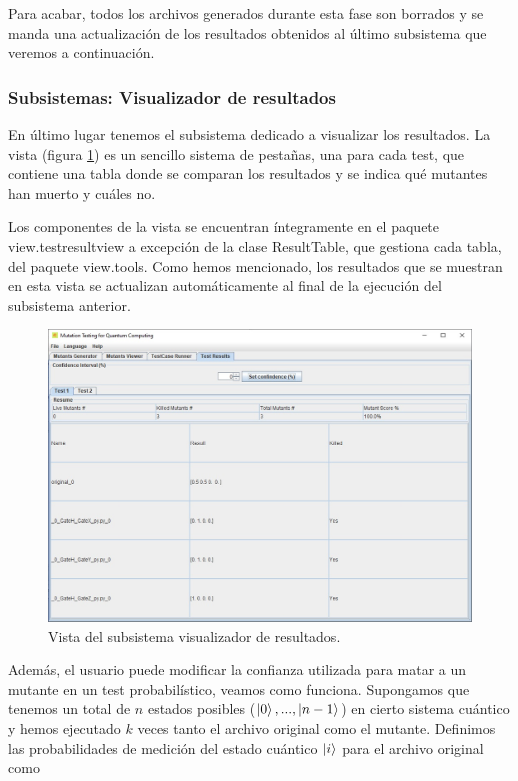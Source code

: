 Para acabar, todos los archivos generados durante esta fase son borrados y se manda una actualización de los resultados obtenidos al último subsistema que veremos a continuación.

\subsubsection{Subsistemas: Visualizador de resultados}

En último lugar tenemos el subsistema dedicado a visualizar los resultados. La vista (figura \ref{fig:vista4}) es un sencillo sistema de pestañas, una para cada test, que contiene una tabla donde se comparan los resultados y se indica qué mutantes han muerto y cuáles no.

Los componentes de la vista se encuentran íntegramente en el paquete view.testresultview a excepción de la clase ResultTable, que gestiona cada tabla, del paquete view.tools. Como hemos mencionado, los resultados que se muestran en esta vista se actualizan automáticamente al final de la ejecución del subsistema anterior.

\begin{figure}[htb]
\begin{center}
\includegraphics[scale=0.45]{images/vista4}
\end{center}
\caption{Vista del subsistema visualizador de resultados.}
\label{fig:vista4}
\end{figure}

Además, el usuario puede modificar la confianza utilizada para matar a un mutante en un test probabilístico, veamos como funciona. Supongamos que tenemos un total de $n$ estados posibles ($\left|0\right\rangle,...,\left|n-1\right\rangle$) en cierto sistema cuántico y hemos ejecutado $k$ veces tanto el archivo original como el mutante. Definimos las probabilidades de medición del estado cuántico $\left|i\right\rangle$ para el archivo original como

